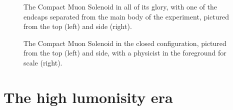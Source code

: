 \begin{figure}[htb]
    \centering
    \quad
    \caption{
        The Compact Muon Solenoid in all of its glory, with one of the endcaps separated from the main body of the experiment, pictured from the top (left) and side (right). 
    }
    \label{fig:cms_pics}
\end{figure}

\begin{figure}[htb]
    \centering
    \quad
    \caption{
        The Compact Muon Solenoid in the closed configuration, pictured from the top (left) and side, with a physicist in the foreground for scale (right).
    }
    \label{fig:cms_jguiang}
\end{figure}

\section{The high lumonisity era}
